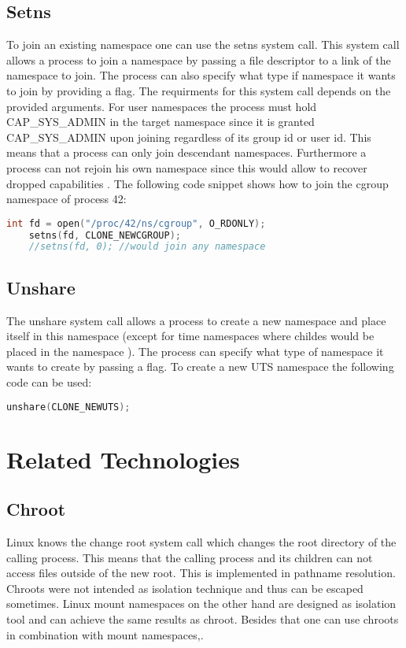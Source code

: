 \documentclass[10pt,twocolumn,a4paper]{article}
\begin{document}
\subsection{ Setns}
To join an existing namespace one can use the setns system call.
This system call allows a process to join a namespace by passing a file descriptor to a link of
the namespace to join. 
The process can also specify what type if namespace it wants to join by providing a flag. 
The requirments for this system call depends on the provided arguments. For user namespaces the process
must hold CAP\_SYS\_ADMIN in the target namespace since it is granted CAP\_SYS\_ADMIN upon joining
regardless of its group id or user id. This means that a process can only
join descendant namespaces. Furthermore a process can not rejoin his own namespace since this would allow to recover dropped capabilities \cite{23}. The following code snippet shows how to join the
cgroup namespace of process 42:
\begin{lstlisting}[language=C]
    int fd = open("/proc/42/ns/cgroup", O_RDONLY);
    setns(fd, CLONE_NEWCGROUP);
    //setns(fd, 0); //would join any namespace
\end{lstlisting}


\subsection{ Unshare}
The unshare system call allows a process to create a new namespace and place itself in this
namespace (except for  time namespaces where childes would be placed in the namespace \cite{15}). 
The process can specify what type of namespace it wants to create by passing a flag. To create a new
UTS namespace the following code can be used:
\begin{lstlisting}[language=C]
    unshare(CLONE_NEWUTS);
\end{lstlisting}\cite{24}
\section{Related Technologies}\label{sec:related}
\subsection{Chroot}
Linux knows the change root system call which changes the root directory of the calling
process. This means that the calling process and its children can not access files outside of the
new root. This is implemented in pathname resolution\cite{1}. Chroots were not intended as
isolation technique and thus can be escaped sometimes. Linux mount namespaces on the other hand are designed as isolation tool and can achieve the same results as chroot. Besides that one can use
chroots in combination with mount namespaces\cite{1},\cite{25}. 
\end{document}
